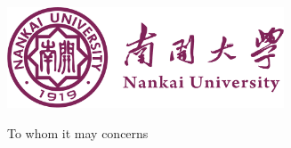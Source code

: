 \documentclass{article}
\begin{document}
\includegraphics[width=0.618\textwidth]{nankai.pdf}









\begin{FlushLeft}
To whom it may concerns
\end{FlushLeft}
\end{document}
